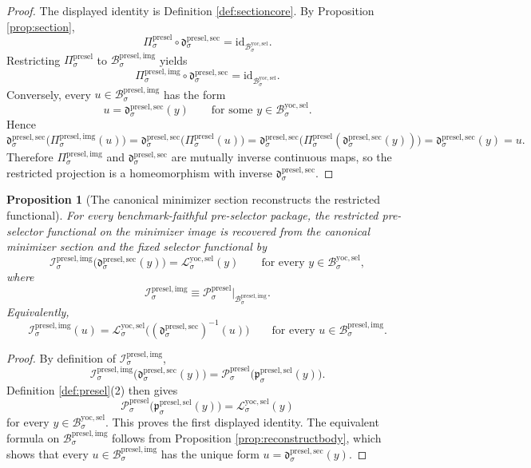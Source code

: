 \documentclass[11pt]{article}
\newcommand{\YoctoSelectorBody}[1]{\mathcal B_{#1}^{\mathrm{yoc,sel}}}
\newcommand{\YoctoSelectorFunctional}[1]{\mathscr L_{#1}^{\mathrm{yoc,sel}}}
\newcommand{\PreSelectorProj}[1]{\Pi_{#1}^{\mathrm{presel}}}
\newcommand{\PreSelectorFunctional}[1]{\mathscr P_{#1}^{\mathrm{presel}}}
\newcommand{\PreSelectorSelectorMin}[1]{\mathfrak p_{#1}^{\mathrm{presel,sel}}}
\newcommand{\PreSelectorMinSection}[1]{\mathfrak d_{#1}^{\mathrm{presel,sec}}}
\newcommand{\PreSelectorImgBody}[1]{\mathcal B_{#1}^{\mathrm{presel,img}}}
\newcommand{\PreSelectorImgProj}[1]{\Pi_{#1}^{\mathrm{presel,img}}}
\newcommand{\PreSelectorImgFunctional}[1]{\mathscr I_{#1}^{\mathrm{presel,img}}}
\newtheorem{proposition}{Proposition}
\begin{document}
\begin{proof}
The displayed identity is Definition \ref{def:sectioncore}. By Proposition \ref{prop:section},
\[
\PreSelectorProj{\sigma}\circ\PreSelectorMinSection{\sigma}
=
\mathrm{id}_{\YoctoSelectorBody{\sigma}}.
\]
Restricting \(\PreSelectorProj{\sigma}\) to \(\PreSelectorImgBody{\sigma}\) yields
\[
\PreSelectorImgProj{\sigma}\circ\PreSelectorMinSection{\sigma}
=
\mathrm{id}_{\YoctoSelectorBody{\sigma}}.
\]
Conversely, every \(u\in\PreSelectorImgBody{\sigma}\) has the form
\[
u=\PreSelectorMinSection{\sigma}(y)
\qquad
\text{for some }
y\in\YoctoSelectorBody{\sigma}.
\]
Hence
\[
\PreSelectorMinSection{\sigma}\bigl(\PreSelectorImgProj{\sigma}(u)\bigr)
=
\PreSelectorMinSection{\sigma}\bigl(\PreSelectorProj{\sigma}(u)\bigr)
=
\PreSelectorMinSection{\sigma}\bigl(\PreSelectorProj{\sigma}(\PreSelectorMinSection{\sigma}(y))\bigr)
=
\PreSelectorMinSection{\sigma}(y)
=
u.
\]
Therefore \(\PreSelectorImgProj{\sigma}\) and \(\PreSelectorMinSection{\sigma}\) are mutually inverse continuous maps, so the restricted projection is a homeomorphism with inverse \(\PreSelectorMinSection{\sigma}\).
\end{proof}

\begin{proposition}[The canonical minimizer section reconstructs the restricted functional]
\label{prop:reconstructfunctional}
For every benchmark-faithful pre-selector package, the restricted pre-selector functional on the minimizer image is recovered from the canonical minimizer section and the fixed selector functional by
\[
\PreSelectorImgFunctional{\sigma}\bigl(\PreSelectorMinSection{\sigma}(y)\bigr)
=
\YoctoSelectorFunctional{\sigma}(y)
\qquad
\text{for every }y\in\YoctoSelectorBody{\sigma},
\]
where
\[
\PreSelectorImgFunctional{\sigma}
\equiv
\PreSelectorFunctional{\sigma}\big|_{\PreSelectorImgBody{\sigma}}.
\]
Equivalently,
\[
\PreSelectorImgFunctional{\sigma}(u)
=
\YoctoSelectorFunctional{\sigma}\bigl((\PreSelectorMinSection{\sigma})^{-1}(u)\bigr)
\qquad
\text{for every }u\in\PreSelectorImgBody{\sigma}.
\]
\end{proposition}

\begin{proof}
By definition of \(\PreSelectorImgFunctional{\sigma}\),
\[
\PreSelectorImgFunctional{\sigma}\bigl(\PreSelectorMinSection{\sigma}(y)\bigr)
=
\PreSelectorFunctional{\sigma}\bigl(\PreSelectorSelectorMin{\sigma}(y)\bigr).
\]
Definition \ref{def:presel}(2) then gives
\[
\PreSelectorFunctional{\sigma}\bigl(\PreSelectorSelectorMin{\sigma}(y)\bigr)
=
\YoctoSelectorFunctional{\sigma}(y)
\]
for every \(y\in\YoctoSelectorBody{\sigma}\). This proves the first displayed identity. The equivalent formula on \(\PreSelectorImgBody{\sigma}\) follows from Proposition \ref{prop:reconstructbody}, which shows that every \(u\in\PreSelectorImgBody{\sigma}\) has the unique form \(u=\PreSelectorMinSection{\sigma}(y)\).
\end{proof}
\end{document}
